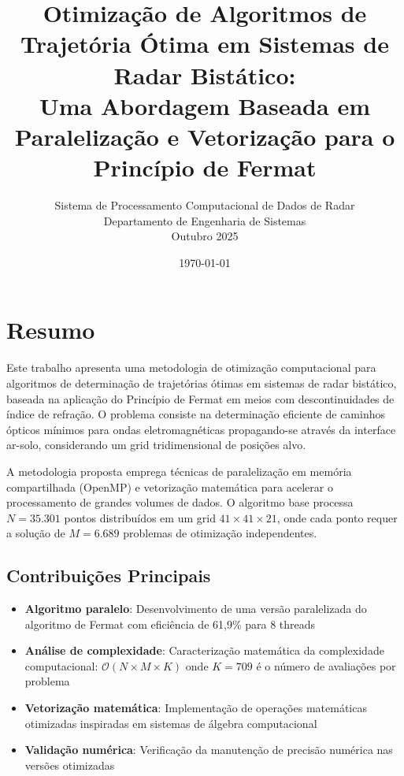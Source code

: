 \documentclass[12pt,a4paper]{article}
\title{\textbf{Otimização de Algoritmos de Trajetória Ótima em Sistemas de Radar Bistático: \\
Uma Abordagem Baseada em Paralelização e Vetorização para o Princípio de Fermat}}
\author{Sistema de Processamento Computacional de Dados de Radar\\
Departamento de Engenharia de Sistemas\\
Outubro 2025}
\date{\today}
\begin{document}
\maketitle

\tableofcontents
\newpage

\section{Resumo}

Este trabalho apresenta uma metodologia de otimização computacional para algoritmos de determinação de trajetórias ótimas em sistemas de radar bistático, baseada na aplicação do Princípio de Fermat em meios com descontinuidades de índice de refração. O problema consiste na determinação eficiente de caminhos ópticos mínimos para ondas eletromagnéticas propagando-se através da interface ar-solo, considerando um grid tridimensional de posições alvo.

A metodologia proposta emprega técnicas de paralelização em memória compartilhada (OpenMP) e vetorização matemática para acelerar o processamento de grandes volumes de dados. O algoritmo base processa $N = 35.301$ pontos distribuídos em um grid $41 \times 41 \times 21$, onde cada ponto requer a solução de $M = 6.689$ problemas de otimização independentes.

\subsection{Contribuições Principais}
\begin{itemize}
    \item \textbf{Algoritmo paralelo}: Desenvolvimento de uma versão paralelizada do algoritmo de Fermat com eficiência de 61,9\% para 8 threads
    \item \textbf{Análise de complexidade}: Caracterização matemática da complexidade computacional: $\mathcal{O}(N \times M \times K)$ onde $K = 709$ é o número de avaliações por problema
    \item \textbf{Vetorização matemática}: Implementação de operações matemáticas otimizadas inspiradas em sistemas de álgebra computacional
    \item \textbf{Validação numérica}: Verificação da manutenção de precisão numérica nas versões otimizadas
\end{itemize}
\end{document}
